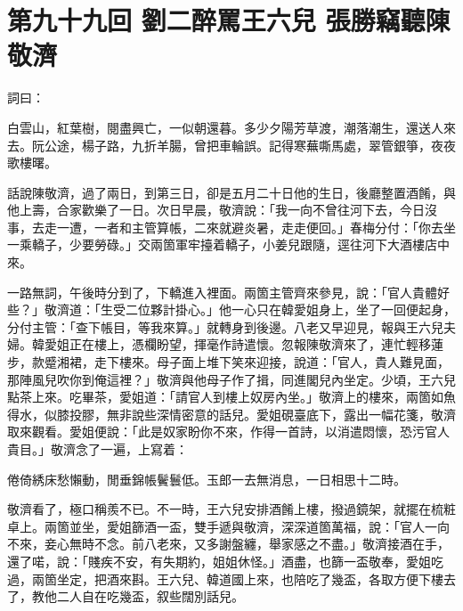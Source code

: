 
\chapter*{第九十九回 劉二醉罵王六兒 張勝竊聽陳敬濟}


詞曰：

\begin{myquote}
白雲山，紅葉樹，閱盡興亡，一似朝還暮。多少夕陽芳草渡，潮落潮生，還送人來去。阮公途，楊子路，九折羊腸，曾把車輪誤。記得寒蕪嘶馬處，翠管銀箏，夜夜歌樓曙。

\end{myquote}

話說陳敬濟，過了兩日，到第三日，卻是五月二十日他的生日，後廳整置酒餚，與他上壽，合家歡樂了一日。次日早晨，敬濟說：「我一向不曾往河下去，今日沒事，去走一遭，一者和主管算帳，二來就避炎暑，走走便回。」春梅分付：「你去坐一乘轎子，少要勞碌。」交兩箇軍牢擡着轎子，小姜兒跟隨，逕往河下大酒樓店中來。

一路無詞，午後時分到了，下轎進入裡面。兩箇主管齊來參見，說：「官人貴體好些？」敬濟道：「生受二位夥計掛心。」他一心只在韓愛姐身上，坐了一回便起身，分付主管：「查下帳目，等我來算。」就轉身到後邊。八老又早迎見，報與王六兒夫婦。韓愛姐正在樓上，憑欄盼望，揮毫作詩遣懷。忽報陳敬濟來了，連忙輕移蓮步，款蹙湘裙，走下樓來。母子面上堆下笑來迎接，說道：「官人，貴人難見面，那陣風兒吹你到俺這裡？」敬濟與他母子作了揖，同進閣兒內坐定。少頃，王六兒點茶上來。吃畢茶，愛姐道：「請官人到樓上奴房內坐。」敬濟上的樓來，兩箇如魚得水，似膝投膠，無非說些深情密意的話兒。愛姐硯臺底下，露出一幅花箋，敬濟取來觀看。愛姐便說：「此是奴家盼你不來，作得一首詩，以消遣悶懷，恐污官人貴目。」敬濟念了一遍，上寫着：

\begin{myquote}[\markfont]
倦倚綉床愁懶動，閒垂錦帳鬢鬟低。玉郎一去無消息，一日相思十二時。
\end{myquote}

敬濟看了，極口稱羨不已。不一時，王六兒安排酒餚上樓，撥過鏡架，就擺在梳粧卓上。兩箇並坐，愛姐篩酒一盃，雙手遞與敬濟，深深道箇萬福，說：「官人一向不來，妾心無時不念。前八老來，又多謝盤纏，舉家感之不盡。」敬濟接酒在手，還了喏，說：「賤疾不安，有失期約，姐姐休怪。」酒盡，也篩一盃敬奉，愛姐吃過，兩箇坐定，把酒來斟。王六兒、韓道國上來，也陪吃了幾盃，各取方便下樓去了，{}教他二人自在吃幾盃，叙些闊別話兒。

